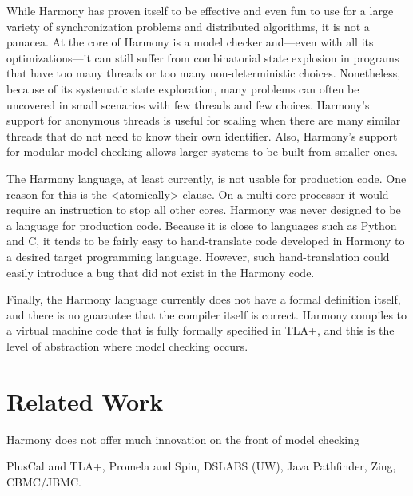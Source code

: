 \documentclass[twocolumn]{article}
\begin{document}
While Harmony has proven itself to be effective and even fun to use
for a large variety of synchronization problems and distributed
algorithms, it is not a panacea.  At the core of Harmony is a model
checker and---even with all its optimizations---it can still suffer
from combinatorial state explosion in programs that have too many
threads or too many non-deterministic choices.  Nonetheless, because
of its systematic state exploration, many problems can often be
uncovered in small scenarios with few threads and few choices.
Harmony's support for anonymous threads is useful for scaling when
there are many similar threads that do not need to know their own
identifier.  Also, Harmony's support for modular model checking
allows larger systems to be built from smaller ones.

The Harmony language, at least currently, is not usable for production
code.  One reason for this is the <{atomically}> clause.  On a multi-core
processor it would require an instruction to stop all other cores.
Harmony was never designed to be a language for production code.  Because
it is close to languages such as Python and C, it tends to be fairly
easy to hand-translate code developed in Harmony to a desired target
programming language.  However, such hand-translation could easily
introduce a bug that did not exist in the Harmony code.

Finally, the Harmony language currently does not have a formal definition
itself, and there is no guarantee that the compiler itself is correct.
Harmony compiles to a virtual machine code that is fully formally
specified in TLA+, and this is the level of abstraction where model
checking occurs.

\section{Related Work}

Harmony does not offer much innovation on the front of model checking

PlusCal and TLA+, Promela and Spin, DSLABS (UW), Java Pathfinder, Zing,
CBMC/JBMC.



\end{document}
